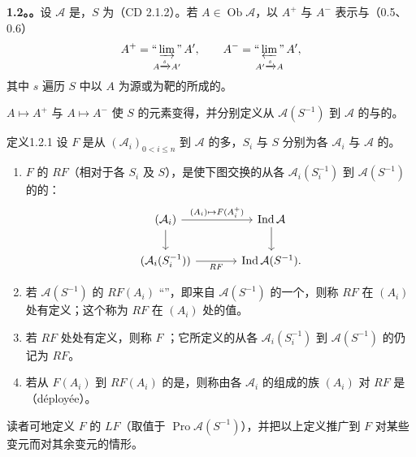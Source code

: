\textbf{1.2。。}设 $\mathcal A$ 是，$S$ 为（CD 2.1.2）。若 $A\in\operatorname{Ob}\mathcal A$，以 $A^+$ 与 $A^-$ 表示与（0.5、0.6）
\[
A^+=\mathop{\text{“}\varinjlim\text{”}}_{A\xrightarrow{s}A'}A',\qquad
A^-=\mathop{\text{“}\varprojlim\text{”}}_{A'\xrightarrow{s}A}A',
\]
其中 $s$ 遍历 $S$ 中以 $A$ 为源或为靶的所成的。

 $A\mapsto A^+$ 与 $A\mapsto A^-$ 使 $S$ 的元素变得，并分别定义从 $\mathcal A(S^{-1})$ 到 $\mathcal A$ 的与的。

\begin{SGAresult}{定义}{1.2.1}
设 $F$ 是从 $(\mathcal A_i)_{0<i\le n}$ 到 $\mathcal A$ 的多，$S_i$ 与 $S$ 分别为各 $\mathcal A_i$ 与 $\mathcal A$ 的。
\begin{enumerate}
\item[(i)] $F$ 的 $RF$（相对于各 $S_i$ 及 $S$），是使下图交换的从各 $\mathcal A_i(S_i^{-1})$ 到 $\mathcal A(S^{-1})$ 的的：
\[
\begin{tikzcd}[column sep=large]
(\mathcal A_i)\arrow[r,"{(A_i)\mapsto F(A_i^+)}"]\arrow[d] &\operatorname{Ind}\mathcal A\arrow[d]\\
(\mathcal A_i(S_i^{-1}))\arrow[r,"RF"']&\operatorname{Ind}\mathcal A(S^{-1}).
\end{tikzcd}
\]
\item[(ii)] 若 $\mathcal A(S^{-1})$ 的 $RF(A_i)$ “”，即来自 $\mathcal A(S^{-1})$ 的一个，则称 $RF$ 在 $(A_i)$ 处有定义；这个称为 $RF$ 在 $(A_i)$ 处的值。
\item[(iii)] 若 $RF$ 处处有定义，则称 $F$ ；它所定义的从各 $\mathcal A_i(S_i^{-1})$ 到 $\mathcal A(S^{-1})$ 的仍记为 $RF$。
\item[(iv)] 若从 $F(A_i)$ 到 $RF(A_i)$ 的是，则称由各 $\mathcal A_i$ 的组成的族 $(A_i)$ 对 $RF$ 是（déployée）。
\end{enumerate}
\end{SGAresult}
读者可地定义 $F$ 的 $LF$（取值于 $\operatorname{Pro}\mathcal A(S^{-1})$），并把以上定义推广到 $F$ 对某些变元而对其余变元的情形。

